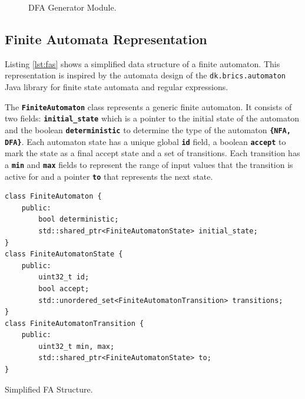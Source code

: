 \begin{figure}[H]
    \centering
    \caption{DFA Generator Module.}\label{fig:sa2}
\end{figure}

\subsection{Finite Automata Representation}
Listing \ref{lst:fas} shows a simplified data structure of a finite automaton. This representation is inspired by the automata design of the \texttt{dk.brics.automaton} \cite{dk} Java library for finite state automata and regular expressions.

The \texttt{\textbf{FiniteAutomaton}} class represents a generic finite automaton. It consists of two fields: \texttt{\textbf{initial\_state}} which is a pointer to the initial state of the automaton and the boolean \texttt{\textbf{deterministic}} to determine the type of the automaton \texttt{\textbf{\{NFA, DFA\}}}. Each automaton state has a unique global \texttt{\textbf{id}} field, a boolean \texttt{\textbf{accept}} to mark the state as a final accept state and a set of transitions. Each transition has a \texttt{\textbf{min}} and \texttt{\textbf{max}} fields to represent the range of input values that the transition is active for and a pointer \texttt{\textbf{to}} that represents the next state. 

\begin{listing}[H]
\begin{verbatim}
class FiniteAutomaton {
    public:
        bool deterministic;
        std::shared_ptr<FiniteAutomatonState> initial_state;
}
class FiniteAutomatonState {
    public:
        uint32_t id;
        bool accept;
        std::unordered_set<FiniteAutomatonTransition> transitions;
}
class FiniteAutomatonTransition {
    public:
        uint32_t min, max;
        std::shared_ptr<FiniteAutomatonState> to;
}
\end{verbatim}
\caption{Simplified FA Structure.}\label{lst:fas}
\end{listing}

